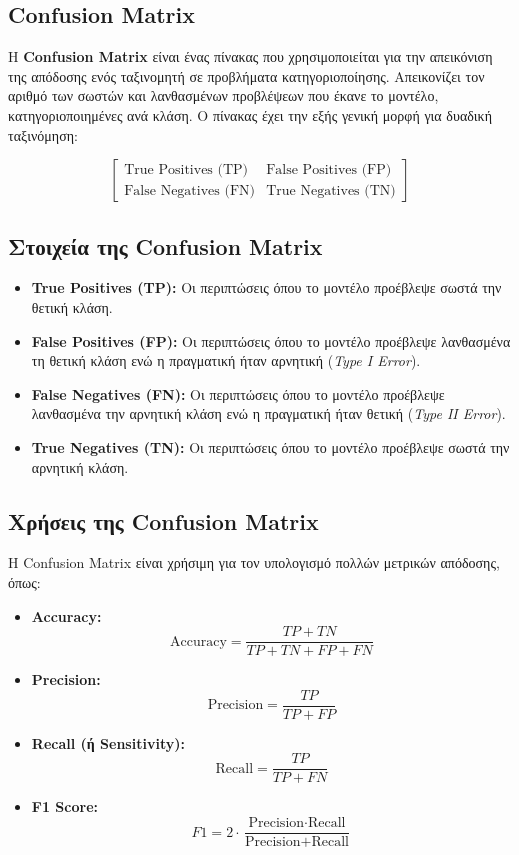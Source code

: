 \documentclass[diploma]{softlab-thesis}
\begin{document}
\subsection{Confusion Matrix}

Η \textbf{Confusion Matrix} είναι ένας πίνακας που χρησιμοποιείται για την απεικόνιση της απόδοσης ενός ταξινομητή σε προβλήματα κατηγοριοποίησης. Απεικονίζει τον αριθμό των σωστών και λανθασμένων προβλέψεων που έκανε το μοντέλο, κατηγοριοποιημένες ανά κλάση. Ο πίνακας έχει την εξής γενική μορφή για δυαδική ταξινόμηση:

\[
\begin{bmatrix}
\text{True Positives (TP)} & \text{False Positives (FP)} \\
\text{False Negatives (FN)} & \text{True Negatives (TN)}
\end{bmatrix}
\]

\subsection*{Στοιχεία της Confusion Matrix}
\begin{itemize}
    \item \textbf{True Positives (TP):} Οι περιπτώσεις όπου το μοντέλο προέβλεψε σωστά την θετική κλάση.
    \item \textbf{False Positives (FP):} Οι περιπτώσεις όπου το μοντέλο προέβλεψε λανθασμένα τη θετική κλάση ενώ η πραγματική ήταν αρνητική (\textit{Type I Error}).
    \item \textbf{False Negatives (FN):} Οι περιπτώσεις όπου το μοντέλο προέβλεψε λανθασμένα την αρνητική κλάση ενώ η πραγματική ήταν θετική (\textit{Type II Error}).
    \item \textbf{True Negatives (TN):} Οι περιπτώσεις όπου το μοντέλο προέβλεψε σωστά την αρνητική κλάση.
\end{itemize}

\subsection*{Χρήσεις της Confusion Matrix}
Η Confusion Matrix είναι χρήσιμη για τον υπολογισμό πολλών μετρικών απόδοσης, όπως:
\begin{itemize}
    \item \textbf{Accuracy:}
    \[
    \text{Accuracy} = \frac{TP + TN}{TP + TN + FP + FN}
    \]
    \item \textbf{Precision:}
    \[
    \text{Precision} = \frac{TP}{TP + FP}
    \]
    \item \textbf{Recall (ή Sensitivity):}
    \[
    \text{Recall} = \frac{TP}{TP + FN}
    \]
    \item \textbf{F1 Score:}
    \[
    F1 = 2 \cdot \frac{\text{Precision} \cdot \text{Recall}}{\text{Precision} + \text{Recall}}
    \]
\end{itemize}
\end{document}
